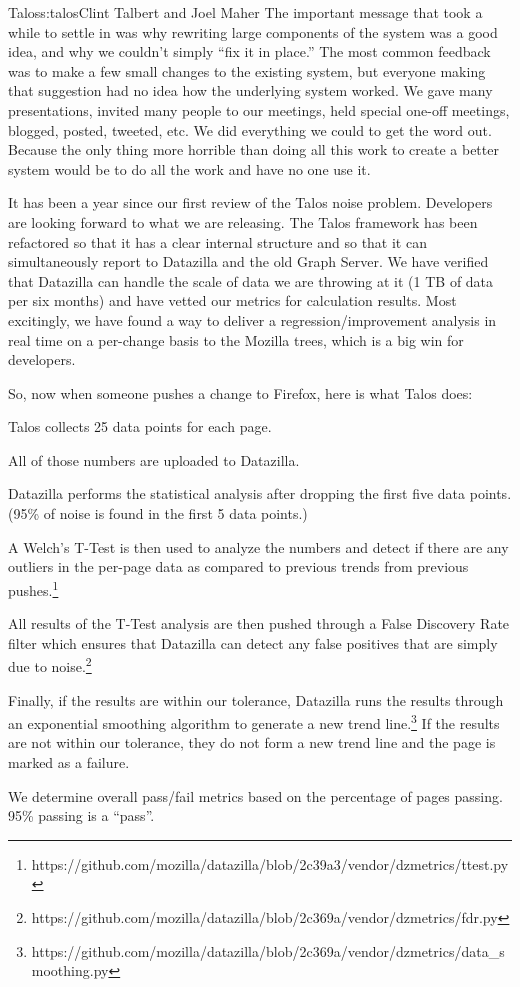 \begin{aosachapter}{Talos}{s:talos}{Clint Talbert and Joel Maher}
The important message that took a while to settle in was why rewriting
large components of the system was a good idea, and why we couldn't
simply ``fix it in place.'' The most common feedback was to make a few
small changes to the existing system, but everyone making that
suggestion had no idea how the underlying system worked. We gave many
presentations, invited many people to our meetings, held special one-off
meetings, blogged, posted, tweeted, etc. We did everything we could to
get the word out. Because the only thing more horrible than doing all
this work to create a better system would be to do all the work and have
no one use it.

It has been a year since our first review of the Talos noise problem.
Developers are looking forward to what we are releasing. The Talos
framework has been refactored so that it has a clear internal structure
and so that it can simultaneously report to Datazilla and the old Graph
Server. We have verified that Datazilla can handle the scale of data we
are throwing at it (1 TB of data per six months) and have vetted our
metrics for calculation results. Most excitingly, we have found a way to
deliver a regression/improvement analysis in real time on a per-change
basis to the Mozilla trees, which is a big win for developers.

So, now when someone pushes a change to Firefox, here is what Talos
does:

\begin{aosaitemize}

\item
  Talos collects 25 data points for each page.
\item
  All of those numbers are uploaded to Datazilla.
\item
  Datazilla performs the statistical analysis after dropping the first
  five data points. (95\% of noise is found in the first 5 data points.)
\item
  A Welch's T-Test is then used to analyze the numbers and detect if
  there are any outliers in the per-page data as compared to previous
  trends from previous pushes.\footnote{https://github.com/mozilla/datazilla/blob/2c39a3/vendor/dzmetrics/ttest.py}
\item
  All results of the T-Test analysis are then pushed through a False
  Discovery Rate filter which ensures that Datazilla can detect any
  false positives that are simply due to noise.\footnote{https://github.com/mozilla/datazilla/blob/2c369a/vendor/dzmetrics/fdr.py}
\item
  Finally, if the results are within our tolerance, Datazilla runs the
  results through an exponential smoothing algorithm to generate a new
  trend line.\footnote{https://github.com/mozilla/datazilla/blob/2c369a/vendor/dzmetrics/data\_smoothing.py}
  If the results are not within our tolerance, they do not form a new
  trend line and the page is marked as a failure.
\item
  We determine overall pass/fail metrics based on the percentage of
  pages passing. 95\% passing is a ``pass''.
\end{aosaitemize}


\end{aosachapter}

